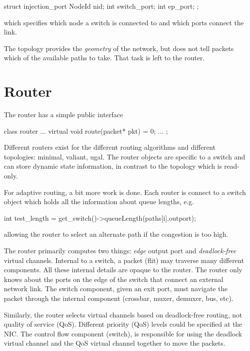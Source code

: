 \begin{CppCode}
struct injection_port {
  NodeId nid;
  int switch_port;
  int ep_port;
};
\end{CppCode}
which specifies which node a switch is connected to and which ports connect the link.

The topology provides the \emph{geometry} of the network, but does not tell packets which of the available paths to take. 
That task is left to the router.


\section{Router}\label{sec:router}
The router has a simple public interface

\begin{CppCode}
class router {
...
  virtual void route(packet* pkt) = 0;
...
};
\end{CppCode}

Different routers exist for the different routing algorithms and different topologies: 	minimal, valiant, ugal.
The router objects are specific to a switch and can store dynamic state information,
in contrast to the topology which is read-only.

For adaptive routing, a bit more work is done.
Each router is connect to a switch object which holds all the information about queue lengths, e.g.

\begin{CppCode}
int test_length = get_switch()->queueLength(paths[i].outport);
\end{CppCode}
allowing the router to select an alternate path if the congestion is too high. 

The router primarily computes two things: \emph{edge} output port and \emph{deadlock-free} virtual channels.
Internal to a switch, a packet (flit) may traverse many different components.
All these internal details are opaque to the router.
The router only knows about the ports on the edge of the switch that connect an external network link. 
The switch component, given an exit port, must navigate the packet through the internal component (crossbar, muxer, demuxer, bus, etc).

Similarly, the router selects virtual channels based on deadlock-free routing, not quality of service (QoS).
Different priority (QoS) levels could be specified at the NIC.
The control flow component (switch), is responsible for using the deadlock virtual channel and the QoS virtual channel together to move the packets. 



